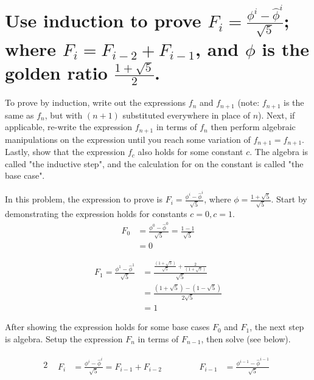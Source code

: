 \section[Problem 2]{Use induction to prove $F_i = \frac{\phi^i - \hat{\phi}^i}{\sqrt{5}}$; where $F_i = F_{i-2} + F_{i-1}$, and $\phi$ is the golden ratio $\frac{1 + \sqrt{5}}{2}$.}

To prove by induction, write out the expressions $f_n$ and $f_{n + 1}$ (note: $f_{n + 1}$ is the same as $f_n$, but with $(n + 1)$ substituted everywhere in place of $n$). Next, if applicable, re-write the expression $f_{n + 1}$ in terms of $f_n$ then perform algebraic manipulations on the expression until you reach some variation of $f_{n + 1} = f_{n + 1}$.  Lastly, show that the expression $f_c$ also holds for some constant $c$. The algebra is called "the inductive step", and the calculation for on the constant is called "the base case".

In this problem, the expression to prove is $F_i = \frac{\phi^i - \hat{\phi}^i}{\sqrt{5}}$, where $\phi = \frac{1 + \sqrt{5}}{\sqrt{5}}$. Start by demonstrating the expression holds for constants $c = 0, c = 1$. 
\begin{align}
	F_0 &= \frac{\phi^0 - \hat{\phi}^0}{\sqrt{5}} = \frac{1 - 1}{\sqrt{5}} \\
		&= 0 
\end{align}

\setcounter{equation}{0}
\begin{align}
	F_1 = \frac{\phi^1 - \hat{\phi}^1}{\sqrt{5}} &= \frac{\frac{\left( 1 + \sqrt{5} \right)}{\sqrt{5}} + \frac{2}{\left( 1 + \sqrt{5} \right)}}{\sqrt{5}} \\
	&= 
	\frac{\left( 1 + \sqrt{5} \right) - \left( 1 - \sqrt{5} \right)}{2 \sqrt{5}} \\
	&=
	1
\end{align}

After showing the expression holds for some base cases $F_0$ and $F_1$, the next step is algebra. Setup the expression $F_n$ in terms of $F_{n - 1}$, then solve (see below). 

\setcounter{equation}{0}
\begin{alignat*}{2}
	&
	\begin{aligned}
		F_i &= \frac{\phi^i - \hat{\phi}^i}{\sqrt{5}} = F_{i - 1} + F_{i - 2}
	\end{aligned}
	& \qquad &
	\begin{aligned}
		F_{i - 1} &= \frac{\phi^{i - 1} - \hat{\phi}^{i - 1}}{\sqrt{5}}
	\end{aligned}
\end{alignat*}

